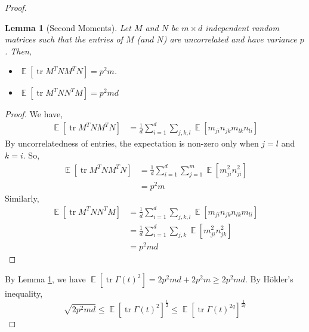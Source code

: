 \documentclass[11pt]{amsart}
\numberwithin{equation}{section}
\numberwithin{equation}{section}
\DeclareMathOperator{\E}{\mathbb{E}}
\DeclareMathOperator*{\tr}{tr}
\newtheorem{lemma}[theorem]{Lemma}
\theoremstyle{remark}
\theoremstyle{definition}
\begin{document}
\begin{proof}
\begin{lemma}[Second Moments]\label{2moment}
    Let $M$ and $N$ be $m \times d$ independent random matrices such that the entries of $M$ (and $N$) are uncorrelated and have variance $p$. Then, 
    \begin{itemize}
        \item $\E [\tr M^T N M^T N ] = p^2m$.
        \item $\E [\tr M^T N N^T M ] = p^2md$
    \end{itemize}
\end{lemma}
\begin{proof}
    We have, 
    \begin{align*}
        \E [\tr M^T N M^T N ] &= \frac{1}{d} \sum_{i=1}^d \sum_{j,k,l} \E [m_{ji}n_{jk}m_{lk}n_{li}  ] 
    \end{align*}
    By uncorrelatedness of entries, the expectation is non-zero only when $j=l$ and $k=i$. So,
    \begin{align*}
        \E [\tr M^T N M^T N ] &= \frac{1}{d} \sum_{i=1}^d \sum_{j=1}^m \E [m_{ji}^2n_{ji}^2 ] \\
        &= p^2m
    \end{align*}
    Similarly,
    \begin{align*}
        \E [\tr M^T N N^T M ] &= \frac{1}{d} \sum_{i=1}^d \sum_{j,k,l} \E [m_{ji}n_{jk}n_{lk}m_{li}  ] \\
        &= \frac{1}{d} \sum_{i=1}^d \sum_{j,k} \E [m_{ji}^2n_{jk}^2  ] \\
        &= p^2md
    \end{align*}
\end{proof}

By Lemma \ref{2moment}, we have $\E [\tr \Gamma(t)^2] = 2p^2md + 2p^2m \ge 2p^2md$. By Hölder's inequality,
\[ \sqrt{2p^2md} \le  \E [\tr \Gamma(t)^2]^\frac{1}{2} \le \E [\tr \Gamma(t)^{2q}]^\frac{1}{2q}  \]


\end{proof}
\end{document}
